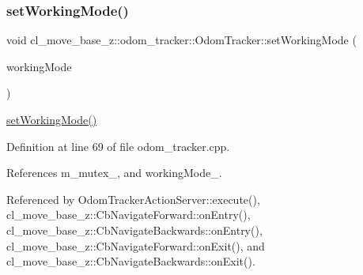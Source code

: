 \subsubsection{\texorpdfstring{set\+Working\+Mode()}{setWorkingMode()}}
{\footnotesize\ttfamily void cl\+\_\+move\+\_\+base\+\_\+z\+::odom\+\_\+tracker\+::\+Odom\+Tracker\+::set\+Working\+Mode (\begin{DoxyParamCaption}\item[{\hyperlink{namespacecl__move__base__z_1_1odom__tracker_ac46b05813b2791604f6cd0a39ace3ef8}{Working\+Mode}}]{working\+Mode }\end{DoxyParamCaption})}

\hyperlink{classcl__move__base__z_1_1odom__tracker_1_1OdomTracker_aeed01bdefd9a1cc709b0b3e4eed285ed}{set\+Working\+Mode()} 

Definition at line 69 of file odom\+\_\+tracker.\+cpp.



References m\+\_\+mutex\+\_\+, and working\+Mode\+\_\+.



Referenced by Odom\+Tracker\+Action\+Server\+::execute(), cl\+\_\+move\+\_\+base\+\_\+z\+::\+Cb\+Navigate\+Forward\+::on\+Entry(), cl\+\_\+move\+\_\+base\+\_\+z\+::\+Cb\+Navigate\+Backwards\+::on\+Entry(), cl\+\_\+move\+\_\+base\+\_\+z\+::\+Cb\+Navigate\+Forward\+::on\+Exit(), and cl\+\_\+move\+\_\+base\+\_\+z\+::\+Cb\+Navigate\+Backwards\+::on\+Exit().


